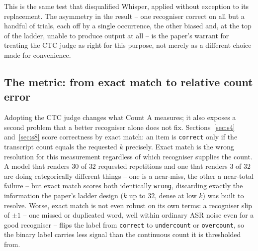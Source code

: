 \documentclass[11pt]{article}
\begin{document}
This is the same test that disqualified Whisper, applied without exception
to its replacement. The asymmetry in the result -- one recogniser correct on
all but a handful of trials, each off by a single occurrence, the other
biased and, at the top of the ladder, unable to produce output at all -- is
the paper's warrant for treating the CTC judge as right for this purpose,
not merely as a different choice made for convenience.

\subsection{The metric: from exact match to relative count error}
\label{sec:s9-metric}

Adopting the CTC judge changes what Count A measures; it also exposes a
second problem that a better recogniser alone does not fix. Sections~\ref{sec:s4}
and~\ref{sec:s8} score correctness by exact match: an item is
\texttt{correct} only if the transcript count equals the requested $k$
precisely. Exact match is the wrong resolution for this measurement
regardless of which recogniser supplies the count. A model that renders
$30$ of $32$ requested repetitions and one that renders $3$ of $32$ are
doing categorically different things -- one is a near-miss, the other a
near-total failure -- but exact match scores both identically \texttt{wrong},
discarding exactly the information the paper's ladder design ($k$ up to $32$,
dense at low $k$) was built to resolve. Worse, exact match is not even
robust on its own terms: a recogniser slip of $\pm1$ -- one missed or
duplicated word, well within ordinary ASR noise even for a good recogniser --
flips the label from \texttt{correct} to \texttt{undercount} or
\texttt{overcount}, so the binary label carries less signal than the
continuous count it is thresholded from.
\end{document}
